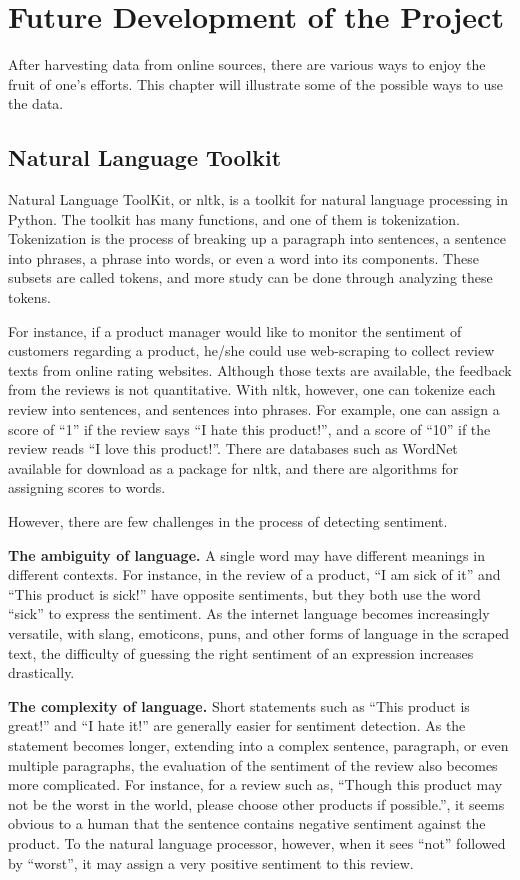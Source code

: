 \documentclass[12pt,twoside,draft]{report}
\begin{document}
\chapter{Future Development of the Project}

After harvesting data from online sources, there are various ways to enjoy the fruit of one's efforts. This chapter will illustrate some of the possible ways to use the data.

\section{Natural Language Toolkit}

Natural Language ToolKit, or \gls{nltk}, is a toolkit for natural language processing in Python. The toolkit has many functions, and one of them is tokenization. Tokenization is the process of breaking up a paragraph into sentences, a sentence into phrases, a phrase into words, or even a word into its components. These subsets are called tokens, and more study can be done through analyzing these tokens.

For instance, if a product manager would like to monitor the sentiment of customers regarding a product, he/she could use web-scraping to collect review texts from online rating websites. Although those texts are available, the feedback from the reviews is not quantitative. With \gls{nltk}, however, one can tokenize each review into sentences, and sentences into phrases. For example, one can assign a score of ``1'' if the review says ``I hate this product!'', and a score of ``10'' if the review reads ``I love this product!''. There are databases such as WordNet available for download as a package for \gls{nltk}, and there are algorithms for assigning scores to words.

However, there are few challenges in the process of detecting sentiment. 

\textbf{The ambiguity of language.} A single word may have different meanings in different contexts. For instance, in the review of a product, ``I am sick of it'' and ``This product is sick!'' have opposite sentiments, but they both use the word ``sick'' to express the sentiment. As the internet language becomes increasingly versatile, with slang, emoticons, puns, and other forms of language in the scraped text, the difficulty of guessing the right sentiment of an expression increases drastically.

\textbf{The complexity of language.} Short statements such as ``This product is great!'' and ``I hate it!'' are generally easier for sentiment detection. As the statement becomes longer, extending into a complex sentence, paragraph, or even multiple paragraphs, the evaluation of the sentiment of the review also becomes more complicated. For instance, for a review such as, ``Though this product may not be the worst in the world, please choose other products if possible.'', it seems obvious to a human that the sentence contains negative sentiment against the product. To the natural language processor, however, when it sees ``not'' followed by ``worst'', it may assign a very positive sentiment to this review.
\end{document}
